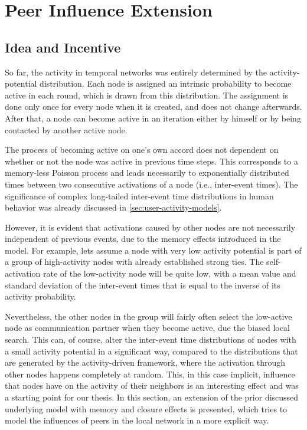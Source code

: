 

\section{Peer Influence Extension}
\label{sec:peer-influence-model}


\subsection{Idea and Incentive}

So far, the activity in temporal networks was entirely determined by the activity-potential distribution.
Each node is assigned an intrinsic probability to become active in each round, which is drawn from this distribution.
The assignment is done only once for every node when it is created, and does not change afterwards.
After that, a node can become active in an iteration either by himself or by being contacted by another active node.

The process of becoming active on one's own accord does not dependent on whether or not the node was active in previous time steps.
This corresponds to a memory-less Poisson process and leads necessarily to exponentially distributed times between two consecutive activations of a node (i.e., inter-event times).
The significance of complex long-tailed inter-event time distributions in human behavior was already discussed in \cref{sec:user-activity-models}.

However, it is evident that activations caused by other nodes are not necessarily independent of previous events, due to the memory effects introduced in the model.
For example, lets assume a node with very low activity potential is part of a group of high-activity nodes with already established strong ties.
The self-activation rate of the low-activity node will be quite low, with a mean value and standard deviation of the inter-event times that is equal to the inverse of its activity probability.

Nevertheless, the other nodes in the group will fairly often select the low-active node as communication partner when they become active, due the biased local search.
This can, of course, alter the inter-event time distributions of nodes with a small activity potential in a significant way, compared to the distributions that are generated by the activity-driven framework, where the activation through other nodes happens completely at random.
This, in this case implicit, influence that nodes have on the activity of their neighbors is an interesting effect and was a starting point for our thesis.
In this section, an extension of the prior discussed underlying model with memory and closure effects is presented, which tries to model the influences of peers in the local network in a more explicit way.

